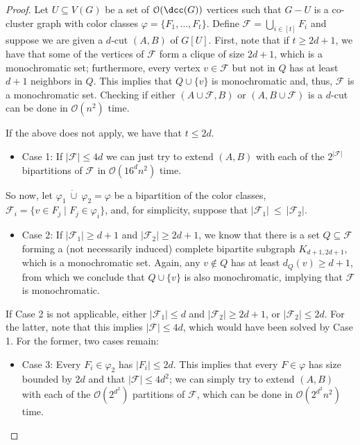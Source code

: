 \documentclass[a4paper,UKenglish,cleveref, autoref]{lipics-v2019}
\newcommand{\bigO}[1]{\mathcal{O}\!\left(#1\right)}
\newcommand{\dcup}{\ \dot\cup\ }
\begin{document}
\begin{proof}
    Let $U \subseteq V(G)$ be a set of $\bigO{\dcc(G)}$ vertices such that $G - U$ is a co-cluster graph with color classes $\varphi = \{F_1, \dots, F_t\}$.
    Define $\mathcal{F} = \bigcup_{i \in [t]} F_i$ and suppose we are given a $d$-cut $(A,B)$ of $G[U]$.
    First, note that if $t \geq 2d+1$, we have that some of the vertices of $\mathcal{F}$ form a clique of size $2d+1$, which is a monochromatic set; furthermore, every vertex $v \in \mathcal{F}$ but not in $Q$ has at least $d+1$ neighbors in $Q$.
    This implies that $Q \cup \{v\}$ is monochromatic and, thus, $\mathcal{F}$ is a monochromatic set.
    Checking if either $(A \cup \mathcal{F}, B)$ or $(A, B \cup \mathcal{F})$ is a $d$-cut can be done in $\bigO{n^2}$ time.

    If the above does not apply, we have that $t \leq 2d$.
    \begin{itemize}
        \item Case 1: If $|\mathcal{F}| \leq 4d$ we can just try to extend $(A,B)$ with each of the $2^{|\mathcal{F}|}$ bipartitions of $\mathcal{F}$ in $\bigO{16^dn^2}$ time.
    \end{itemize}

    So now, let $\varphi_1 \dcup \varphi_2 = \varphi$ be a bipartition of the color classes, $\mathcal{F}_i = \{v \in F_j \mid F_j \in \varphi_i\}$, and, for simplicity, suppose that $|\mathcal{F}_1|~\leq~|\mathcal{F}_2|$.

    \begin{itemize}
        \item Case 2: If $|\mathcal{F}_1| \geq d+1$ and $|\mathcal{F}_2| \geq 2d+1$, we know that there is a set $Q \subseteq \mathcal{F}$ forming a (not necessarily induced) complete bipartite subgraph $K_{d+1, 2d+1}$, which is a monochromatic set.
        Again, any $v \notin Q$ has at least $d_Q(v) \geq d+1$, from which we conclude that $Q \cup \{v\}$ is also monochromatic, implying that $\mathcal{F}$ is monochromatic.
    \end{itemize}


    If Case 2 is not applicable, either $|\mathcal{F}_1| \leq d$ and $|\mathcal{F}_2| \geq 2d+1$, or $|\mathcal{F}_2| \leq 2d$.
    For the latter, note that this implies $|\mathcal{F}| \leq 4d$, which would have been solved by Case 1.
    For the former, two cases remain:

    \begin{itemize}
        \item Case 3: Every $F_i \in \varphi_2$ has $|F_i| \leq 2d$. This implies that every $F \in \varphi$ has size bounded by $2d$ and that $|\mathcal{F}| \leq 4d^2$; we can simply try to extend $(A, B)$ with each of the $\bigO{2^{d^2}}$ partitions of $\mathcal{F}$, which can be done in $\bigO{2^{d^2}n^2}$ time.


\end{itemize}
\end{proof}
\end{document}
